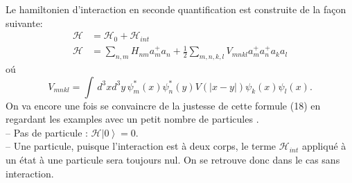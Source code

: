 \documentclass[12pt,a4paper, openany]{article}
\begin{document}
\hspace{0.5cm}Le hamiltonien d'interaction en seconde quantification est construite de la façon suivante:\\
\begin{equation}
\begin{aligned}
\mathcal{H}&=\mathcal{H}_0+\mathcal{H}_{int} \\
\mathcal{H}&=\sum_{n,m}H_{nm}a^{+}_{m}a_n+\frac{1}{2}\sum_{m,n,k,l}V_{mnkl}a^{+
}_ma^{+}_na_ka_l
\end{aligned}
\end{equation}
o\'{u}  \\
\begin{equation}
V_{mnkl}=\int\,d^{3}xd^{3}y\,{\psi}^{*}_m(x){\psi}^{*}_n(y)V(\left|x-y\right|){\psi}_k(x){\psi}_l(x)	.
\end{equation}
On va encore une fois se convaincre de la justesse de cette formule (18) en regardant les examples avec un petit nombre de particules .\\

– Pas de particule : $\mathcal{H}\left|0\right\rangle=0 $.\\

– Une particule, puisque l’interaction est à deux corps, le terme $\mathcal{H}_{int}$ appliqué à un état à une particule sera toujours nul. On se retrouve donc dans le cas sans interaction.\\
\end{document}
